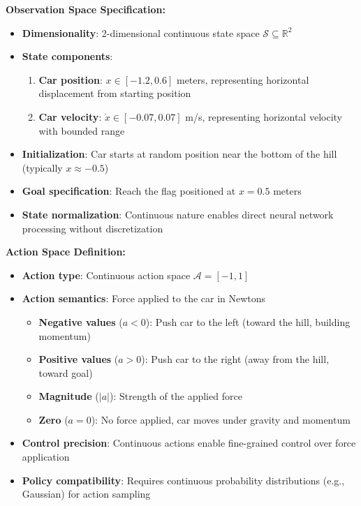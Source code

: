 \documentclass[12pt]{article}
\begin{document}
{{{\textbf{Observation Space Specification:}
\begin{itemize}
    \item \textbf{Dimensionality}: 2-dimensional continuous state space $\mathcal{S} \subseteq \mathbb{R}^2$
    \item \textbf{State components}:
    \begin{enumerate}
        \item \textbf{Car position}: $x \in [-1.2, 0.6]$ meters, representing horizontal displacement from starting position
        \item \textbf{Car velocity}: $\dot{x} \in [-0.07, 0.07]$ m/s, representing horizontal velocity with bounded range
    \end{enumerate}
    \item \textbf{Initialization}: Car starts at random position near the bottom of the hill (typically $x \approx -0.5$)
    \item \textbf{Goal specification}: Reach the flag positioned at $x = 0.5$ meters
    \item \textbf{State normalization}: Continuous nature enables direct neural network processing without discretization
\end{itemize}

\textbf{Action Space Definition:}
\begin{itemize}
    \item \textbf{Action type}: Continuous action space $\mathcal{A} = [-1, 1]$
    \item \textbf{Action semantics}: Force applied to the car in Newtons
    \begin{itemize}
        \item \textbf{Negative values} ($a < 0$): Push car to the left (toward the hill, building momentum)
        \item \textbf{Positive values} ($a > 0$): Push car to the right (away from the hill, toward goal)
        \item \textbf{Magnitude} ($|a|$): Strength of the applied force
        \item \textbf{Zero} ($a = 0$): No force applied, car moves under gravity and momentum
    \end{itemize}
    \item \textbf{Control precision}: Continuous actions enable fine-grained control over force application
    \item \textbf{Policy compatibility}: Requires continuous probability distributions (e.g., Gaussian) for action sampling
\end{itemize}

}}}
\end{document}
